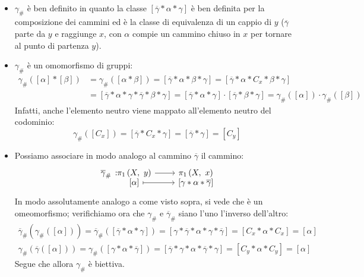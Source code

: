 \begin{demonstration}~{}
	\begin{itemize}
		\item $\gamma_{\#}$ è ben definito in quanto la classe $\left[\overline{\gamma}\ast\alpha\ast\gamma\right]$ è ben definita per la composizione dei cammini ed è la classe di equivalenza di un cappio di $y$ ($\overline{\gamma}$ parte da $y$ e raggiunge $x$, con $\alpha$ compie un cammino chiuso in $x$ per tornare al punto di partenza $y$).
		\item $\gamma_{\#}$ è un omomorfismo di gruppi:
		\begin{equation*}
			\begin{array}{lll}
				\gamma_{\#}\left(\left[\alpha\right]\ast\left[\beta\right]\right)&=\gamma_{\#}\left(\left[\alpha\ast\beta\right]\right)=\left[\overline{\gamma}\ast\alpha\ast\beta\ast\gamma\right]=\left[\overline{\gamma}\ast\alpha\ast C_x\ast\beta\ast\gamma\right]\\
				&=\left[\overline{\gamma}\ast\alpha\ast \gamma\ast\overline{\gamma}\ast\beta\ast\gamma\right]=\left[\overline{\gamma}\ast\alpha\ast\gamma\right]\cdot\left[\overline{\gamma}\ast\beta\ast\gamma\right]=\gamma_{\#}\left(\left[\alpha\right]\right)\cdot \gamma_{\#}\left(\left[\beta\right]\right)
			\end{array}
		\end{equation*}
	Infatti, anche l'elemento neutro viene mappato all'elemento neutro del codominio:
	\begin{equation*}
		\gamma_{\#}\left(\left[C_x\right]\right)=\left[\overline{\gamma}\ast C_x\ast\gamma\right]=\left[\overline{\gamma}\ast\gamma\right]=\left[C_y\right]
	\end{equation*}
	\item Possiamo associare in modo analogo al cammino $\overline{\gamma}$ il cammino:
	\begin{equation*}
		\funztot{\overline{\gamma}_{\#}}{\gruf{X}{y}}{\gruf{X}{x}}{\left[\alpha\right]}{\left[\gamma\ast\alpha\ast\overline{\gamma}\right]}
	\end{equation*}
In modo assolutamente analogo a come visto sopra, si vede che è un omeomorfismo; verifichiamo ora che $\gamma_{\#}$ e $\overline{\gamma}_{\#}$ siano l'uno l'inverso dell'altro:
\begin{gather*}
	\overline{\gamma}_{\#}\left(\gamma_{\#}\left(\left[\alpha\right]\right)\right)=\overline{\gamma}_{\#}\left(\left[\overline{\gamma}\ast\alpha\ast\gamma\right]\right)=\left[\gamma\ast\overline{\gamma}\ast\alpha\ast\gamma\ast\overline{\gamma}\right]=\left[C_x\ast\alpha\ast C_x\right]=\left[\alpha\right]\\
	\gamma_{\#}\left(\overline{\gamma}\left(\left[\alpha\right]\right)\right)=
	\gamma_{\#}\left(\left[\gamma\ast\alpha\ast\overline{\gamma}\right]\right)=\left[\overline{\gamma}\ast\gamma\ast\alpha\ast\overline{\gamma}\ast\gamma\right]=\left[C_y\ast\alpha\ast C_y\right]=\left[\alpha\right]
\end{gather*}
Segue che allora $\gamma_{\#}$ è biettiva.
\end{itemize}
\end{demonstration}
